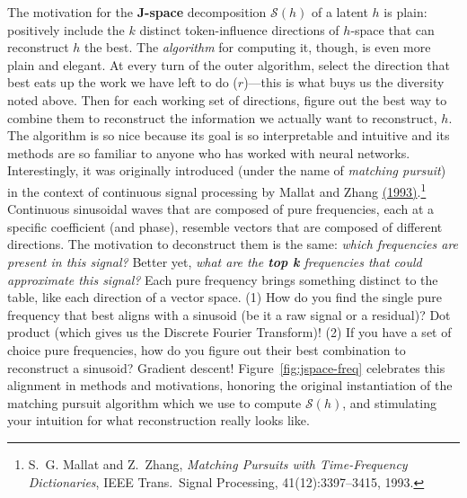 \documentclass{article}
\newcommand{\jspace}{\mathscr{S}}
\begin{document}
The motivation for the \textbf{J-space} decomposition \(\jspace(h)\) of a latent \(h\) is plain: positively include the \(k\) distinct token-influence directions of \(h\)-space that can reconstruct \(h\) the best. The \textit{algorithm} for computing it, though, is even more plain and elegant. At every turn of the outer algorithm, select the direction that best eats up the work we have left to do (\(r\))---this is what buys us the diversity noted above. Then for each working set of directions, figure out the best way to combine them to reconstruct the information we actually want to reconstruct, \(h\). The algorithm is so nice because its goal is so interpretable and intuitive and its methods are so familiar to anyone who has worked with neural networks. Interestingly, it was originally introduced (under the name of \textit{matching pursuit}) in the context of continuous signal processing by Mallat and Zhang \href{https://doi.org/10.1109/78.258082}{(1993)}.\footnote{S.~G. Mallat and Z.~Zhang, \textit{Matching Pursuits with Time-Frequency Dictionaries}, IEEE Trans.\ Signal Processing, 41(12):3397--3415, 1993.} Continuous sinusoidal waves that are composed of pure frequencies, each at a specific coefficient (and phase), resemble vectors that are composed of different directions. The motivation to deconstruct them is the same: \textit{which frequencies are present in this signal?} Better yet, \textit{what are the \textbf{top k }frequencies that could approximate this signal?} Each pure frequency brings something distinct to the table, like each direction of a vector space. (1) How do you find the single pure frequency that best aligns with a sinusoid (be it a raw signal or a residual)? Dot product (which gives us the Discrete Fourier Transform)! (2) If you have a set of choice pure frequencies, how do you figure out their best combination to reconstruct a sinusoid? Gradient descent!  Figure~\ref{fig:jspace-freq} celebrates this alignment in methods and motivations, honoring the original instantiation of the matching pursuit algorithm which we use to compute \(\jspace(h)\), and stimulating your intuition for what reconstruction really looks like. 
\end{document}
